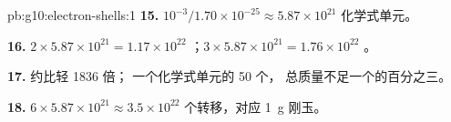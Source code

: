 \begin{solution}{pb:g10:electron-shells:1}
\textbf{15.} $10^{-3} / 1.70 \times 10^{-25} \approx 5.87 \times 10^{21}$
化学式单元。

\textbf{16.} $2 \times 5.87 \times 10^{21} = 1.17 \times 10^{22}$
 ；$3 \times 5.87 \times 10^{21} = 1.76 \times 10^{22}$
 。

\textbf{17.} 约比轻 1836 倍；
一个化学式单元的 50 个，
总质量不足一个的百分之三。

\textbf{18.} $6 \times 5.87 \times 10^{21} \approx 3.5 \times 10^{22}$
个转移，对应 \qty{1}{g} 刚玉。
\end{solution}
